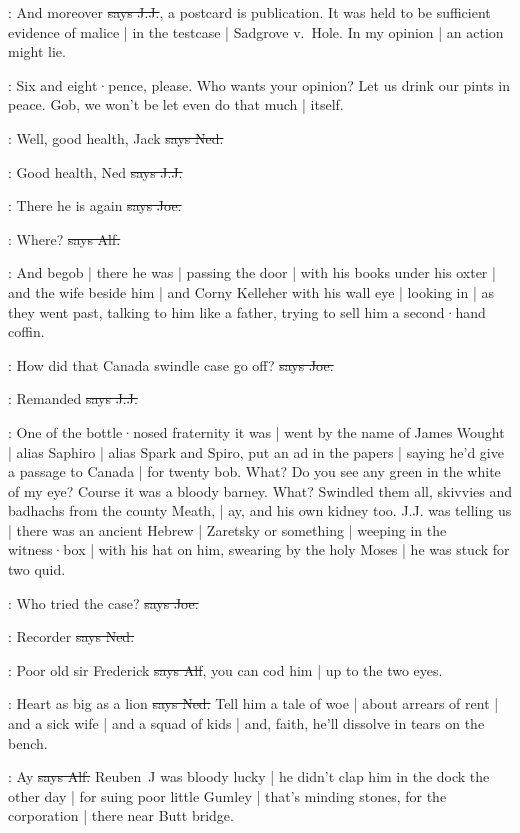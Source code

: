 \jjom:
And moreover
\sout{says J.J.},
a postcard is publication.
It was held to be sufficient evidence of malice |
in the testcase |
Sadgrove v.~Hole.
In my opinion |
an action might lie.

\Nq:
Six and eight·pence,
please.
Who wants your opinion?
Let us drink our pints in peace.
Gob,
we won't be let even do that much |
itself.

\lambert:
Well,
good health,
Jack
\sout{says Ned.}

\jjom:
Good health,
Ned
\sout{says J.J.}

\joe:
There he is again
\sout{says Joe.}

\bergan:
Where?
\sout{says Alf.}

\Nq:
And begob |
there he was
 |
passing the door |
with his books under his oxter |
and the wife beside him |
and Corny Kelleher with his wall eye |
looking in |
as they went past,
talking to him like a father,
trying to sell him a second·hand coffin.

\joe:
How did that Canada swindle case go off?
\sout{says Joe.}

\jjom:
Remanded
\sout{says J.J.}

\Nq:
One of the bottle·nosed fraternity it was |
went by the name of James Wought |
alias Saphiro |
alias Spark and Spiro,
put an ad in the papers |
saying he'd give a passage to Canada |
for twenty bob.
What?
Do you see any green in the white of my eye?
Course it was a bloody barney.
What?
Swindled them all,
skivvies and badhachs from the county Meath,
 |
ay,
and his own kidney too.
J.J. was telling us |
there was an ancient Hebrew |
Zaretsky or something |
weeping in the witness·box |
with his hat on him,
swearing by the holy Moses |
he was stuck for two quid.

\joe:
Who tried the case?
\sout{says Joe.}

\lambert:
Recorder
\sout{says Ned.}

\bergan:
Poor old sir Frederick
\sout{says Alf},
you can cod him |
up to the two eyes.

\lambert:
Heart as big as a lion
\sout{says Ned.}
Tell him a tale of woe |
about arrears of rent |
and a sick wife |
and a squad of kids |
and,
faith,
he'll dissolve in tears on the bench.

\bergan:
Ay
\sout{says Alf.}
Reuben~J was bloody lucky |
he didn't clap him in the dock the other day |
for suing poor little Gumley |
that's minding stones,
for the corporation |
there near Butt bridge.

